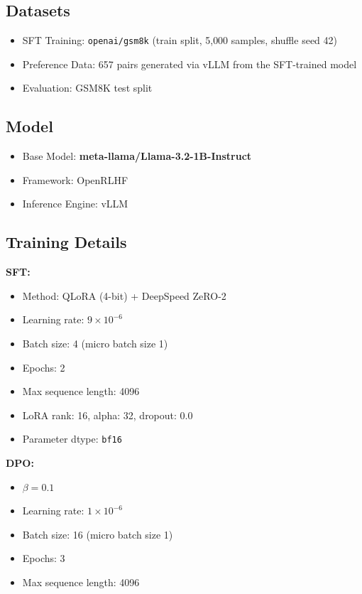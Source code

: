 \documentclass{article}
\begin{document}
\subsection{Datasets}

\begin{itemize}
    \item SFT Training: \texttt{openai/gsm8k} (train split, 5{,}000 samples, shuffle seed 42)
    \item Preference Data: 657 pairs generated via vLLM from the SFT-trained model
    \item Evaluation: GSM8K test split
\end{itemize}

\subsection{Model}

\begin{itemize}
    \item Base Model: \textbf{meta-llama/Llama-3.2-1B-Instruct}
    \item Framework: OpenRLHF
    \item Inference Engine: vLLM
\end{itemize}

\subsection{Training Details}

\textbf{SFT:}
\begin{itemize}
    \item Method: QLoRA (4-bit) + DeepSpeed ZeRO-2
    \item Learning rate: $9 \times 10^{-6}$
    \item Batch size: 4 (micro batch size 1)
    \item Epochs: 2
    \item Max sequence length: 4096
    \item LoRA rank: 16, alpha: 32, dropout: 0.0
    \item Parameter dtype: \texttt{bf16}
\end{itemize}

\textbf{DPO:}
\begin{itemize}
    \item $\beta = 0.1$
    \item Learning rate: $1 \times 10^{-6}$
    \item Batch size: 16 (micro batch size 1)
    \item Epochs: 3
    \item Max sequence length: 4096
\end{itemize}
\end{document}
